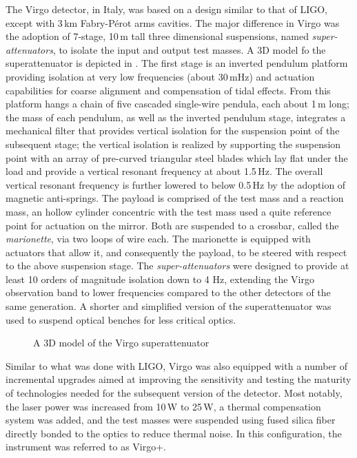 The Virgo detector\cite{Accadia_2012}, in Italy, was based on a design similar to that of LIGO, except with 3\,km Fabry-P\'{e}rot arms cavities. 
The major difference in Virgo was the adoption of 7-stage, 10\,m tall three dimensional suspensions, named \textit{super-attenuators}, to isolate the input and output test masses.
A 3D model fo the superattenuator is depicted in . The first stage is an inverted pendulum platform providing isolation at very low frequencies (about 30\,mHz) and actuation capabilities for coarse alignment and compensation of tidal effects.
From this platform hangs a chain of five cascaded single-wire pendula, each about 1\,m long; the mass of each pendulum, as well as the inverted pendulum stage, integrates a mechanical filter that provides vertical isolation for the suspension point of the subsequent stage; the vertical isolation is realized by supporting the suspension point with an array of pre-curved triangular steel blades which lay flat under the load and provide a vertical resonant frequency at about 1.5\,Hz.
The overall vertical resonant frequency is further lowered to below 0.5\,Hz by the adoption of magnetic anti-springs.
The payload is comprised of the test mass and a reaction mass, an hollow cylinder concentric with the test mass used a quite reference point for actuation on the mirror. Both are suspended to a crossbar, called the \textit{marionette}, via two loops of wire each.
The marionette is equipped with actuators that allow it, and consequently the payload, to be steered with respect to the above suspension stage. 
The \textit{super-attenuators} were designed to provide at least 10 orders of magnitude isolation down to 4 Hz, extending the Virgo observation band to lower frequencies compared to the other detectors of the same generation.
A shorter and simplified version of the superattenuator was used to suspend optical benches for less critical optics.

\begin{figure}
	\caption{\label{fig:superattenuator}A 3D model of the Virgo superattenuator}
\end{figure}

Similar to what was done with LIGO, Virgo was also equipped with a number of incremental upgrades aimed at improving the sensitivity and testing the maturity of technologies needed for the subsequent version of the detector.
Most notably, the laser power was increased from 10\,W to 25\,W, a thermal compensation system was added, and the test masses were suspended using fused silica fiber directly bonded to the optics to reduce thermal noise\cite{Lorenzini_2010}.
In this configuration, the instrument was referred to as Virgo+.

